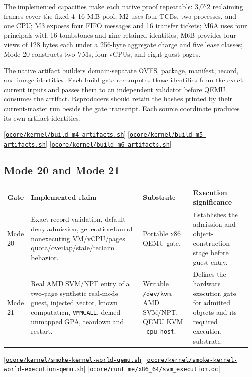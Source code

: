 \documentclass[11pt,oneside]{article}
\newcommand{\src}[1]{\textcolor{OSlate}{\scriptsize[\href{https://github.com/lostadi/OSTADIX/blob/c0b02c326b2329a95ba52447c7180bc93957cd57/#1}{\nolinkurl{#1}}]}\allowbreak}
\begin{document}
The implemented capacities make each native proof repeatable: 3,072 reclaiming
frames cover the fixed 4--16 MiB pool; M2 uses four TCBs, two processes, and
one CPU; M3 exposes four FIFO messages and 16 transfer tickets; M6A uses four
principals with 16 tombstones and nine retained identities; M6B provides four
views of 128 bytes each under a 256-byte aggregate charge and five lease
classes; Mode 20 constructs two VMs, four vCPUs, and eight guest pages.

The native artifact builders domain-separate OVFS, package, manifest, record,
and image identities. Each build gate recomputes those identities from the
exact current inputs and passes them to an independent validator before QEMU
consumes the artifact. Reproducers should retain the hashes printed by their
current-master run beside the gate transcript. Each source coordinate produces
its own artifact identities.

\src{ocore/kernel/build-m4-artifacts.sh}
\src{ocore/kernel/build-m5-artifacts.sh}
\src{ocore/kernel/build-m6-artifacts.sh}

\subsection{Mode 20 and Mode 21}

\begin{longtable}{P{0.11\textwidth} P{0.38\textwidth} P{0.19\textwidth} P{0.20\textwidth}}
\toprule
\textbf{Gate} & \textbf{Implemented claim} & \textbf{Substrate} & \textbf{Execution significance} \\
\midrule
\endhead
Mode 20 &
Exact record validation, default-deny admission, generation-bound
nonexecuting VM/vCPU/pages, quota/overlap/stale/reclaim behavior. &
Portable x86 QEMU gate. &
Establishes the admission and object-construction stage before guest entry. \\
Mode 21 &
Real AMD SVM/NPT entry of a two-page synthetic real-mode guest, injected
vector, known computation, \texttt{VMMCALL}, denied unmapped GPA, teardown and
restart. &
Writable \texttt{/dev/kvm}, AMD SVM/NPT, QEMU KVM \texttt{-cpu host}. &
Defines the hardware execution gate for admitted objects and its required
execution substrate. \\
\bottomrule
\end{longtable}

\src{ocore/kernel/smoke-kernel-world-qemu.sh}
\src{ocore/kernel/smoke-kernel-world-execution-qemu.sh}
\src{ocore/runtime/x86_64/svm_execution.oc}
\end{document}
